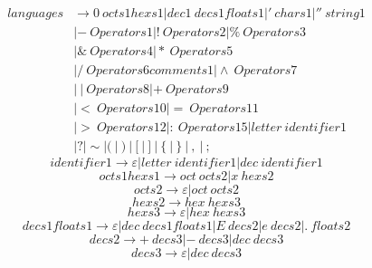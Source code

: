 \documentclass{article}
\begin{document}
\begin{equation}
	\begin{aligned}
		languages & \rightarrow 0 \ octs1hexs1 | dec1 \ decs1floats1 | ' \ chars1 | '' \ string1           \\
		          & | - \ Operators1 | ! \ Operators2 | \% \ Operators3                                    \\
		          & | \& \ Operators4 | * \ Operators5                                                     \\
		          & | / \ Operators6comments1 | \wedge \ Operators7                                        \\
		          & | \ | \ Operators8 | + \ Operators9                                                    \\
		          & | < \ Operators10 | = \ Operators11                                                    \\
		          & | > \ Operators12 | \colon \ Operators15 | letter \ identifier1                            \\
		          & | ? | \sim | (  \ | \  )  \ | \  [  \ | \  ]  \ | \  \{  \ | \  \}  \ | \  ,  \ | \  ;
	\end{aligned}
\end{equation}
\begin{equation}
	identifier1 \rightarrow \varepsilon | letter \ identifier1 | dec \ identifier1
\end{equation}
\begin{equation}
	octs1hexs1 \rightarrow oct \ octs2 | x \ hexs2
\end{equation}
\begin{equation}
	octs2 \rightarrow \varepsilon | oct \ octs2
\end{equation}
\begin{equation}
	hexs2 \rightarrow hex \ hexs3
\end{equation}
\begin{equation}
	hexs3 \rightarrow \varepsilon | hex \ hexs3
\end{equation}
\begin{equation}
	decs1floats1 \rightarrow \varepsilon | dec \ decs1floats1 | E \ decs2 | e \ decs2 | . \ floats2
\end{equation}
\begin{equation}
	decs2 \rightarrow + \ decs3 | - \ decs3 | dec \ decs3
\end{equation}
\begin{equation}
	decs3 \rightarrow \varepsilon | dec \ decs3
\end{equation}
\end{document}
